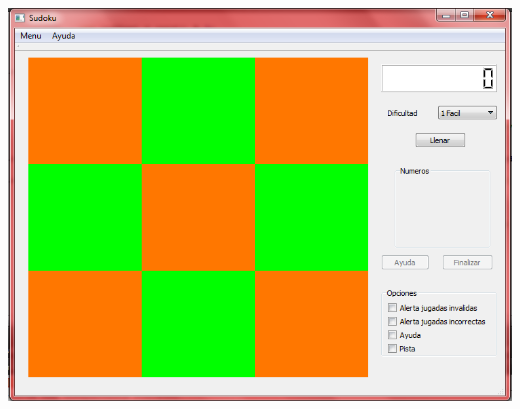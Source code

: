 \documentclass[12pt,oneside]{book}
\begin{document}
	\includegraphics[width=1.10\textwidth]{./imagenes/PantallaPrincipal.png}
\end{document}
